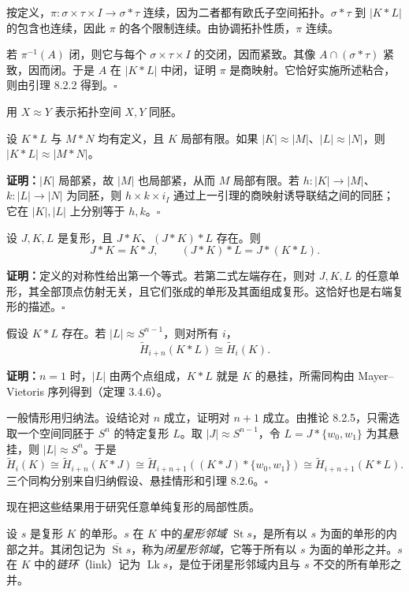 按定义，$\pi:\sigma\times\tau\times I\to\sigma*\tau$ 连续，因为二者都有欧氏子空间拓扑。$\sigma*\tau$ 到 $|K*L|$ 的包含也连续，因此 $\pi$ 的各个限制连续。由协调拓扑性质，$\pi$ 连续。

若 $\pi^{-1}(A)$ 闭，则它与每个 $\sigma\times\tau\times I$ 的交闭，因而紧致。其像 $A\cap(\sigma*\tau)$ 紧致，因而闭。于是 $A$ 在 $|K*L|$ 中闭，证明 $\pi$ 是商映射。它恰好实施所述粘合，则由引理 8.2.2 得到。\hfill$\square$

用 $X\approx Y$ 表示拓扑空间 $X,Y$ 同胚。

设 $K*L$ 与 $M*N$ 均有定义，且 $K$ 局部有限。如果 $|K|\approx|M|$、$|L|\approx|N|$，则 $|K*L|\approx|M*N|$。

\textbf{证明：}$|K|$ 局部紧，故 $|M|$ 也局部紧，从而 $M$ 局部有限。若 $h:|K|\to|M|$、$k:|L|\to|N|$ 为同胚，则 $h\times k\times i_I$ 通过上一引理的商映射诱导联结之间的同胚；它在 $|K|,|L|$ 上分别等于 $h,k$。\hfill$\square$

设 $J,K,L$ 是复形，且 $J*K$、$(J*K)*L$ 存在。则
\[J*K=K*J,\qquad (J*K)*L=J*(K*L).\]

\textbf{证明：}定义的对称性给出第一个等式。若第二式左端存在，则对 $J,K,L$ 的任意单形，其全部顶点仿射无关，且它们张成的单形及其面组成复形。这恰好也是右端复形的描述。\hfill$\square$

假设 $K*L$ 存在。若 $|L|\approx S^{n-1}$，则对所有 $i$，
\[\widetilde H_{i+n}(K*L)\cong\widetilde H_i(K).\]

\textbf{证明：}$n=1$ 时，$|L|$ 由两个点组成，$K*L$ 就是 $K$ 的悬挂，所需同构由 Mayer--Vietoris 序列得到（定理 3.4.6）。

一般情形用归纳法。设结论对 $n$ 成立，证明对 $n+1$ 成立。由推论 8.2.5，只需选取一个空间同胚于 $S^n$ 的特定复形 $L$。取 $|J|\approx S^{n-1}$，令 $L=J*\{w_0,w_1\}$ 为其悬挂，则 $|L|\approx S^n$。于是
\[
\widetilde H_i(K)\cong\widetilde H_{i+n}(K*J)
\cong\widetilde H_{i+n+1}((K*J)*\{w_0,w_1\})
\cong\widetilde H_{i+n+1}(K*L).
\]
三个同构分别来自归纳假设、悬挂情形和引理 8.2.6。\hfill$\square$

现在把这些结果用于研究任意单纯复形的局部性质。

设 $s$ 是复形 $K$ 的单形。$s$ 在 $K$ 中的\emph{星形邻域} $\operatorname{St}s$，是所有以 $s$ 为面的单形的内部之并。其闭包记为 $\overline{\operatorname{St}}s$，称为\emph{闭星形邻域}，它等于所有以 $s$ 为面的单形之并。$s$ 在 $K$ 中的\emph{链环}（link）记为 $\operatorname{Lk}s$，是位于闭星形邻域内且与 $s$ 不交的所有单形之并。

